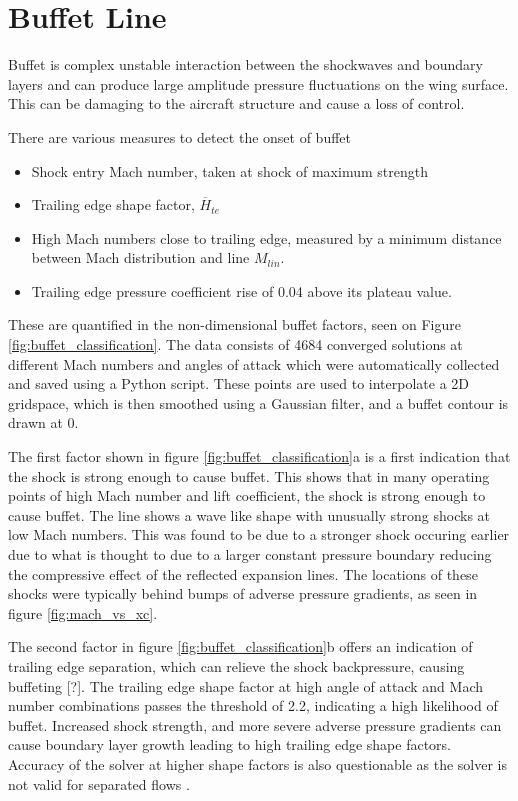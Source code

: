 \documentclass{article}
\begin{document}
\newpage

\section{Buffet Line}

Buffet is complex unstable interaction between the shockwaves and boundary layers and can produce large amplitude pressure fluctuations on the wing surface.
This can be damaging to the aircraft structure and cause a loss of control.

There are various measures to detect the onset of buffet
\begin{itemize}
    \item Shock entry Mach number, taken at shock of maximum strength
    \item Trailing edge shape factor, $\overline{H}_{te}$
    \item High Mach numbers close to trailing edge, measured by a minimum distance between Mach distribution and line $M_{lin}$.
    \item Trailing edge pressure coefficient rise of 0.04 above its plateau value.
\end{itemize}
These are quantified in the non-dimensional buffet factors, seen on Figure \ref{fig:buffet_classification}.
The data consists of 4684 converged solutions at different Mach numbers and angles of attack which were automatically collected and saved using a Python script.
These points are used to interpolate a 2D gridspace, which is then smoothed using a Gaussian filter, and a buffet contour is drawn at 0.

The first factor shown in figure \ref{fig:buffet_classification}a is a first indication that the shock is strong enough to cause buffet.
This shows that in many operating points of high Mach number and lift coefficient, the shock is strong enough to cause buffet.
The line shows a wave like shape with unusually strong shocks at low Mach numbers.
This was found to be due to a stronger shock occuring earlier due to what is thought to due to a larger constant pressure boundary
reducing the compressive effect of the reflected expansion lines.
The locations of these shocks were typically behind bumps of adverse pressure gradients, as seen in figure \ref{fig:mach_vs_xc}.

The second factor in figure \ref{fig:buffet_classification}b offers an indication of trailing edge separation, which can relieve the shock backpressure, causing buffeting [?].
The trailing edge shape factor at high angle of attack and Mach number combinations passes the threshold of 2.2, indicating a high likelihood of buffet.
Increased shock strength, and more severe adverse pressure gradients can cause boundary layer growth leading to high trailing edge shape factors.
Accuracy of the solver at higher shape factors is also questionable as the solver is not valid for separated flows \cite{esdu}.
\end{document}
